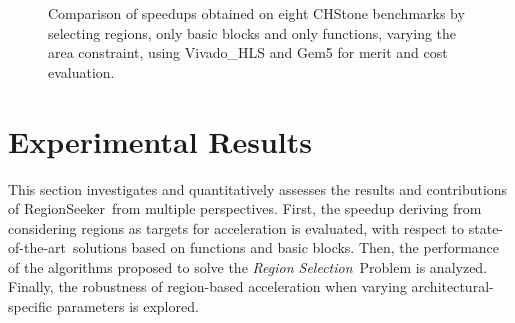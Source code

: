 \documentclass[]{usiinfthesis}
\newcommand{\rseeker}{{RegionSeeker}}
\newcommand{\SoTA}{{state-of-the-art}}
\newcommand{\rsprobname}{\emph{Region Selection}}
\begin{document}
\begin{figure}
{}
\caption{Comparison of speedups obtained on eight CHStone benchmarks
  by selecting regions, only basic blocks and only functions, varying
  the area constraint, using Vivado\_HLS and Gem5 for merit and cost
  evaluation. }
\label{fig:regions_vivado}
\end{figure}

\section{Experimental Results}
\label{subsec:exp}

This section investigates and quantitatively assesses the results and
contributions of \rseeker\ from multiple perspectives. First, the speedup 
deriving from considering regions as targets for acceleration is evaluated, 
with respect to \SoTA\ solutions based on functions and basic blocks. Then, the
performance of the algorithms proposed to solve the \rsprobname\ Problem
is analyzed.  Finally, the robustness of region-based acceleration when varying
architectural-specific parameters is explored.\par
\end{document}
